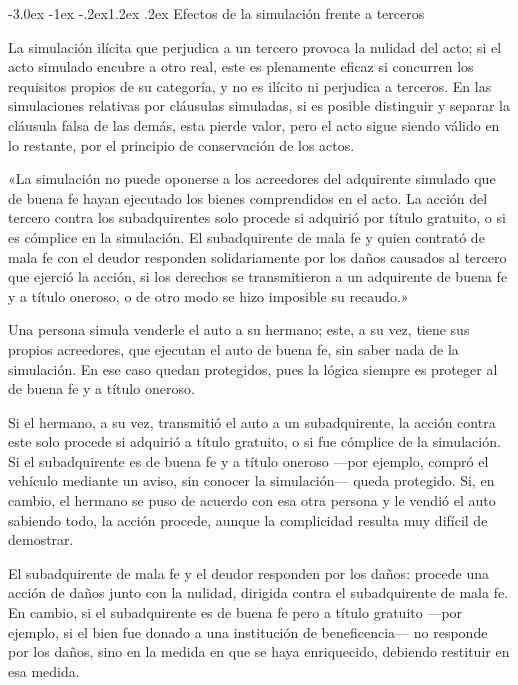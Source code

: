 \documentclass[12pt,oneside]{book}
\makeatletter
\renewcommand\section{\@startsection{section}{1}{\z@}%
  {-3.0ex \@plus -1ex \@minus -.2ex}{1.2ex \@plus .2ex}%
  {\normalfont\large\bfseries\color{acento}}}
\makeatother
\begin{document}
\section{Efectos de la simulación frente a terceros}

La simulación ilícita que perjudica a un tercero provoca la nulidad del acto; si el acto simulado encubre a otro real, este es plenamente eficaz si concurren los requisitos propios de su categoría, y no es ilícito ni perjudica a terceros. En las simulaciones relativas por cláusulas simuladas, si es posible distinguir y separar la cláusula falsa de las demás, esta pierde valor, pero el acto sigue siendo válido en lo restante, por el principio de conservación de los actos.

\begin{regla}
«La simulación no puede oponerse a los acreedores del adquirente simulado que de buena fe hayan ejecutado los bienes comprendidos en el acto. La acción del tercero contra los subadquirentes solo procede si adquirió por título gratuito, o si es cómplice en la simulación. El subadquirente de mala fe y quien contrató de mala fe con el deudor responden solidariamente por los daños causados al tercero que ejerció la acción, si los derechos se transmitieron a un adquirente de buena fe y a título oneroso, o de otro modo se hizo imposible su recaudo.»
\end{regla}

\begin{ejemplo}
Una persona simula venderle el auto a su hermano; este, a su vez, tiene sus propios acreedores, que ejecutan el auto de buena fe, sin saber nada de la simulación. En ese caso quedan protegidos, pues la lógica siempre es proteger al de buena fe y a título oneroso.

Si el hermano, a su vez, transmitió el auto a un subadquirente, la acción contra este solo procede si adquirió a título gratuito, o si fue cómplice de la simulación. Si el subadquirente es de buena fe y a título oneroso ---por ejemplo, compró el vehículo mediante un aviso, sin conocer la simulación--- queda protegido. Si, en cambio, el hermano se puso de acuerdo con esa otra persona y le vendió el auto sabiendo todo, la acción procede, aunque la complicidad resulta muy difícil de demostrar.

El subadquirente de mala fe y el deudor responden por los daños: procede una acción de daños junto con la nulidad, dirigida contra el subadquirente de mala fe. En cambio, si el subadquirente es de buena fe pero a título gratuito ---por ejemplo, si el bien fue donado a una institución de beneficencia--- no responde por los daños, sino en la medida en que se haya enriquecido, debiendo restituir en esa medida.
\end{ejemplo}
\end{document}
